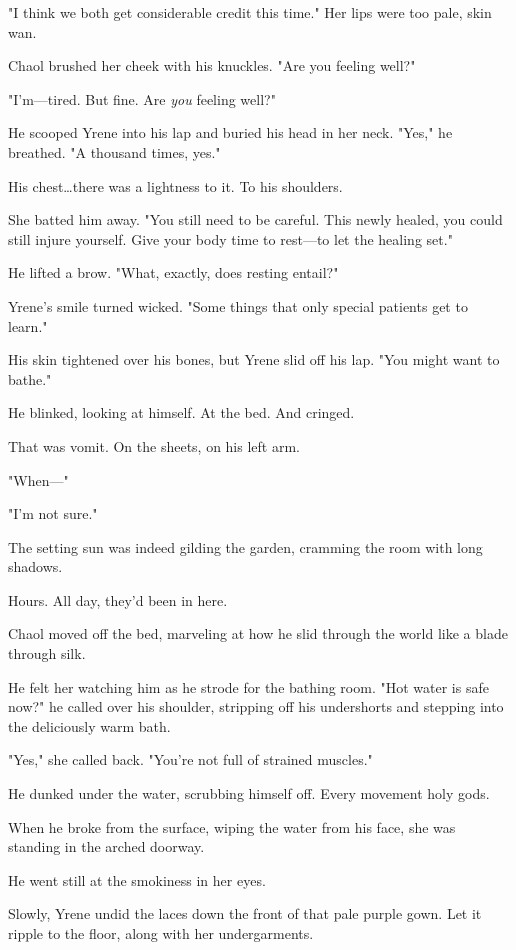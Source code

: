"I think we both get considerable credit this time."
Her lips were too pale, skin wan.

Chaol brushed her cheek with his knuckles.
"Are you feeling well?"

"I'm---tired.
But fine.
Are \emph{you} feeling well?"

He scooped Yrene into his lap and buried his head in her neck.
"Yes," he breathed.
"A thousand times, yes."

His chest\ldots there was a lightness to it.
To his shoulders.

She batted him away.
"You still need to be careful.
This newly healed, you could still injure yourself.
Give your body time to rest---to let the healing set."

He lifted a brow.
"What, exactly, does resting entail?"

Yrene's smile turned wicked.
"Some things that only special patients get to learn."

His skin tightened over his bones, but Yrene slid off his lap.
"You might want to bathe."

He blinked, looking at himself.
At the bed.
And cringed.

That was vomit.
On the sheets, on his left arm.

"When---"

"I'm not sure."

The setting sun was indeed gilding the garden, cramming the room with long shadows.

Hours.
All day, they'd been in here.

Chaol moved off the bed, marveling at how he slid through the world like a blade through silk.

He felt her watching him as he strode for the bathing room.
"Hot water is safe now?"
he called over his shoulder, stripping off his undershorts and stepping into the deliciously warm bath.

"Yes," she called back.
"You're not full of strained muscles."

He dunked under the water, scrubbing himself off.
Every movement  holy gods.

When he broke from the surface, wiping the water from his face, she was standing in the arched doorway.

He went still at the smokiness in her eyes.

Slowly, Yrene undid the laces down the front of that pale purple gown.
Let it ripple to the floor, along with her undergarments.

